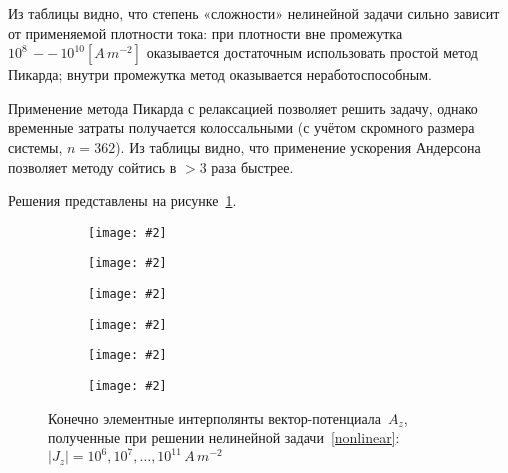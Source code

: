 \documentclass[a4paper, 14pt]{extarticle}
\newcommand{\includegraphicsw}[2][1.]{\texttt{[image: \#2]}}
\begin{document}
	
	Из таблицы видно, что степень «сложности» нелинейной задачи сильно зависит от применяемой плотности тока: при плотности вне промежутка~$10^8\,--\,10^{10} \left[A\,m^{-2}\right]$ оказывается достаточным использовать простой метод Пикарда; внутри промежутка метод оказывается неработоспособным.
	
	Применение метода Пикарда с релаксацией позволяет решить задачу, однако временные затраты получается колоссальными (с учётом скромного размера системы, $n = 362$). Из таблицы видно, что применение ускорения Андерсона позволяет методу сойтись в $>3$ раза быстрее. 
	
	Решения представлены на рисунке~\ref{fig:nonlinearA}.

	\begin{figure}
		\centering
		\begin{subfigure}{.42\linewidth}
			\centering
			\includegraphicsw{a_nonlinear_6.png}
		\end{subfigure}%
		\hfill
		\begin{subfigure}{.42\linewidth}
			\centering
			\includegraphicsw{a_nonlinear_7.png}
		\end{subfigure}%
		\par\bigskip
		\begin{subfigure}{.42\linewidth}
			\centering
			\includegraphicsw{a_nonlinear_8.png}
		\end{subfigure}%
		\hfill
		\begin{subfigure}{.42\linewidth}
			\centering
			\includegraphicsw{a_nonlinear_9.png}
		\end{subfigure}%
		\par\bigskip
		\begin{subfigure}{.42\linewidth}
			\centering
			\includegraphicsw{a_nonlinear_10.png}
		\end{subfigure}%
		\hfill
		\begin{subfigure}{.42\linewidth}
			\centering
			\includegraphicsw{a_nonlinear_11.png}
		\end{subfigure}
		\caption{Конечно элементные интерполянты вектор-потенциала~$A_z$, полученные при решении нелинейной задачи~\eqref{nonlinear}: $|J_z| = 10^6, 10^7, \dots, 10^{11}\,A\,m^{-2}$}
		\label{fig:nonlinearA}
	\end{figure}
	
\end{document}

